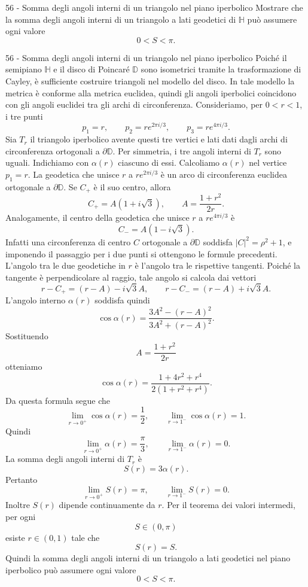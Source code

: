 \documentclass[a4paper]{article}
\begin{document}
\begin{snippetexercise}{56 - Somma degli angoli interni di un triangolo
    nel piano iperbolico}
    Mostrare che la somma degli angoli interni di un triangolo a lati
    geodetici di \(\mathbb{H}\) può assumere ogni valore
    \[
        0<S<\pi.
    \]
\end{snippetexercise}

\begin{snippetsolution}{56 - Somma degli angoli interni di un triangolo
    nel piano iperbolico}
    Poiché il semipiano \(\mathbb{H}\) e il disco di Poincaré \(\mathbb{D}\) sono isometrici tramite la trasformazione di Cayley, è sufficiente costruire triangoli nel modello del disco. In tale modello la metrica è conforme alla metrica euclidea, quindi gli angoli iperbolici coincidono con gli angoli euclidei tra gli archi di circonferenza.
    Consideriamo, per \(0<r<1\), i tre punti
    \[
        p_1=r,
        \qquad
        p_2=re^{2\pi i/3},
        \qquad
        p_3=re^{4\pi i/3}.
    \]
    Sia \(T_r\) il triangolo iperbolico avente questi tre vertici e lati dati dagli archi di circonferenza ortogonali a \(\partial\mathbb{D}\). Per simmetria, i tre angoli interni di \(T_r\) sono uguali. Indichiamo con \(\alpha(r)\) ciascuno di essi.
    Calcoliamo \(\alpha(r)\) nel vertice \(p_1=r\). La geodetica che unisce \(r\) a \(re^{2\pi i/3}\) è un arco di circonferenza euclidea ortogonale a \(\partial\mathbb{D}\). Se \(C_+\) è il suo centro, allora
    \[
        C_+=A(1+i\sqrt3),
        \qquad
        A=\frac{1+r^2}{2r}.
    \]
    Analogamente, il centro della geodetica che unisce \(r\) a \(re^{4\pi i/3}\) è
    \[
        C_-=A(1-i\sqrt3).
    \]
    Infatti una circonferenza di centro \(C\) ortogonale a \(\partial\mathbb{D}\) soddisfa \(|C|^2=\rho^2+1\), e imponendo il passaggio per i due punti si ottengono le formule precedenti.
    L'angolo tra le due geodetiche in \(r\) è l'angolo tra le rispettive tangenti. Poiché la tangente è perpendicolare al raggio, tale angolo si calcola dai vettori
    \[
        r-C_+=(r-A)-i\sqrt3A,
        \qquad
        r-C_-=(r-A)+i\sqrt3A.
    \]
    L'angolo interno \(\alpha(r)\) soddisfa quindi
    \[
        \cos\alpha(r)
        =
        \frac{3A^2-(r-A)^2}{3A^2+(r-A)^2}.
    \]
    Sostituendo
    \[
        A=\frac{1+r^2}{2r}
    \]
    otteniamo
    \[
        \cos\alpha(r)
        =
        \frac{1+4r^2+r^4}{2(1+r^2+r^4)}.
    \]
    Da questa formula segue che
    \[
        \lim_{r\to0^+}\cos\alpha(r)=\frac12,
        \qquad
        \lim_{r\to1^-}\cos\alpha(r)=1.
    \]
    Quindi
    \[
        \lim_{r\to0^+}\alpha(r)=\frac{\pi}{3},
        \qquad
        \lim_{r\to1^-}\alpha(r)=0.
    \]
    La somma degli angoli interni di \(T_r\) è
    \[
        S(r)=3\alpha(r).
    \]
    Pertanto
    \[
        \lim_{r\to0^+}S(r)=\pi,
        \qquad
        \lim_{r\to1^-}S(r)=0.
    \]
    Inoltre \(S(r)\) dipende continuamente da \(r\). Per il teorema dei valori intermedi, per ogni
    \[
        S\in(0,\pi)
    \]
    esiste \(r\in(0,1)\) tale che
    \[
        S(r)=S.
    \]
    Quindi la somma degli angoli interni di un triangolo a lati geodetici nel piano iperbolico può assumere ogni valore
    \[
        0<S<\pi.
    \]
\end{snippetsolution}
\end{document}
